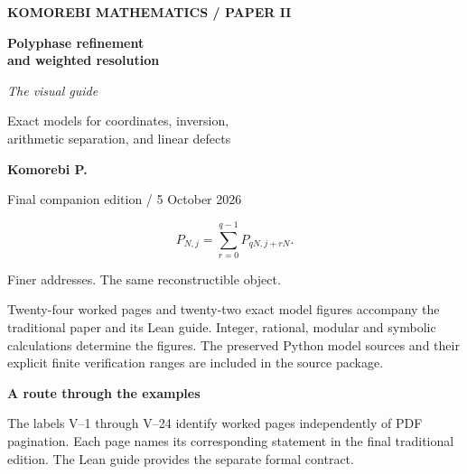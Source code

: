 \documentclass[11pt,a4paper]{article}
\begin{document}
\begin{titlepage}
\thispagestyle{empty}
\vspace*{14mm}
{\sffamily\bfseries\small\color{accent}KOMOREBI MATHEMATICS / PAPER II}\par
\vspace{5mm}{\color{accent}\rule{\linewidth}{1pt}}\par
\vspace{12mm}
{\sffamily\bfseries\fontsize{32}{36}\selectfont Polyphase refinement\\and weighted resolution\par}
\vspace{9mm}
{\fontsize{23}{28}\selectfont\itshape The visual guide\par}
\vspace{8mm}
{\large Exact models for coordinates, inversion,\\arithmetic separation, and linear defects\par}
\vspace{15mm}
{\sffamily\bfseries Komorebi P.}\par
{\sffamily\small\color{muted}Final companion edition / 5 October 2026}\par
\vfill
{\Large\[P_{N,j}=\sum_{r=0}^{q-1}P_{qN,j+rN}.\]}
\begin{center}\small Finer addresses. The same reconstructible object.\end{center}
\vfill
\begin{minipage}{.96\linewidth}
Twenty-four worked pages and twenty-two exact model figures accompany the
traditional paper and its Lean guide. Integer, rational, modular and symbolic
calculations determine the figures. The preserved Python model sources and
their explicit finite verification ranges are included in the source package.
\end{minipage}
\end{titlepage}
{\sffamily\bfseries\Large\color{accent}A route through the examples}\par\medskip
The labels V--1 through V--24 identify worked pages independently of PDF
pagination. Each page names its corresponding statement in the final
traditional edition. The Lean guide provides the separate formal contract.
\medskip
\end{document}
